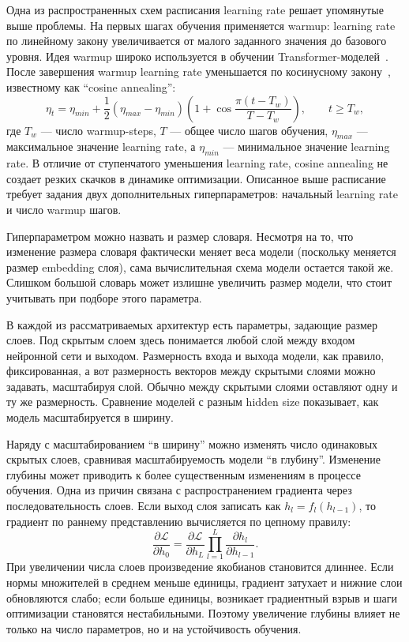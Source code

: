 Одна из распространенных схем расписания learning rate решает упомянутые выше проблемы.
На первых шагах обучения применяется warmup: learning rate по линейному закону увеличивается от малого заданного значения до базового уровня.
Идея warmup широко используется в обучении Transformer-моделей~\cite{transformer}.
После завершения warmup learning rate уменьшается по косинусному закону~\cite{sgdr}, известному как ``cosine annealing'':
\[
	\eta_t = \eta_{min} + \frac{1}{2}(\eta_{max} - \eta_{min})
	\left(1 + \cos\frac{\pi(t - T_w)}{T - T_w}\right),
	\qquad t \geq T_w,
\]
где $T_w$ --- число warmup-steps, $T$ --- общее число шагов обучения, $\eta_{max}$ --- максимальное значение learning rate, а $\eta_{min}$ --- минимальное значение learning rate.
В отличие от ступенчатого уменьшения learning rate, cosine annealing не создает резких скачков в динамике оптимизации.
Описанное выше расписание требует задания двух дополнительных гиперпараметров: начальный learning rate и число warmup шагов.

Гиперпараметром можно назвать и размер словаря. Несмотря на то, что изменение размера словаря фактически меняет веса модели (поскольку меняется размер embedding слоя), сама вычислительная схема модели остается такой же.
Слишком большой словарь может излишне увеличить размер модели, что стоит учитывать при подборе этого параметра.

В каждой из рассматриваемых архитектур есть параметры, задающие размер слоев. Под скрытым слоем здесь понимается любой слой между входом нейронной сети и выходом.
Размерность входа и выхода модели, как правило, фиксированная, а вот размерность векторов между скрытыми слоями можно задавать, масштабируя слой.
Обычно между скрытыми слоями оставляют одну и ту же размерность. Сравнение моделей с разным hidden size показывает, как модель масштабируется в ширину.

Наряду с масштабированием ``в ширину'' можно изменять число одинаковых скрытых слоев, сравнивая масштабируемость модели ``в глубину''.
Изменение глубины может приводить к более существенным изменениям в процессе обучения.
Одна из причин связана с распространением градиента через последовательность слоев. Если выход слоя записать как $h_l = f_l(h_{l-1})$, то градиент по раннему представлению вычисляется по цепному правилу:
\[
	\frac{\partial \mathcal{L}}{\partial h_0}
	= \frac{\partial \mathcal{L}}{\partial h_L}
	\prod_{l=1}^{L}\frac{\partial h_l}{\partial h_{l-1}}.
\]
При увеличении числа слоев произведение якобианов становится длиннее.
Если нормы множителей в среднем меньше единицы, градиент затухает и нижние слои обновляются слабо; если больше единицы, возникает градиентный взрыв и шаги оптимизации становятся нестабильными.
Поэтому увеличение глубины влияет не только на число параметров, но и на устойчивость обучения.

